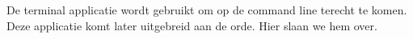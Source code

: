 De terminal applicatie wordt gebruikt om op de command line terecht te komen. Deze applicatie komt later uitgebreid aan
de orde. Hier slaan we hem over.

